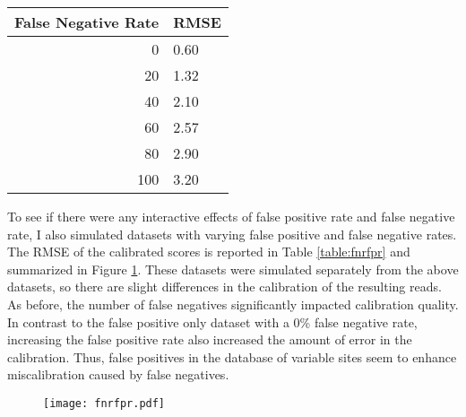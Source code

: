 \begin{table}
\centering
\begin{tabular}{r l}
\toprule
False Negative Rate & RMSE \\
\midrule
0 & 0.60 \\
20 & 1.32 \\
40 & 2.10 \\
60 & 2.57 \\
80 & 2.90 \\
100 & 3.20 \\
\bottomrule
\end{tabular}
\label{table:fnr}
\end{table}

To see if there were any interactive effects of false positive rate and false negative rate, I also simulated datasets with varying false positive and false negative rates. The RMSE of the calibrated scores is reported in Table \ref{table:fnrfpr} and summarized in Figure \ref{figure:fnrfpr}. These datasets were simulated separately from the above datasets, so there are slight differences in the calibration of the resulting reads.
As before, the number of false negatives significantly impacted calibration quality. In contrast to the false positive only dataset with a 0\% false negative rate, increasing the false positive rate also increased the amount of error in the calibration. Thus, false positives in the database of variable sites seem to enhance miscalibration caused by false negatives.

\begin{figure}
	\centering
	\texttt{[image: fnrfpr.pdf]}
	\label{figure:fnrfpr}
\end{figure}

